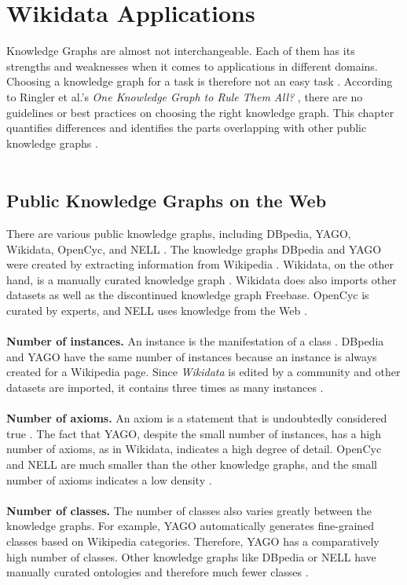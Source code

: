 ﻿\documentclass[11pt,titlepage,oneside,openany]{book}
\begin{document}
\chapter{Wikidata Applications}
\label{chap:applications}
Knowledge Graphs are almost not interchangeable. Each of them has its strengths and weaknesses when it comes to applications in different domains. Choosing a knowledge graph for a task is therefore not an easy task \cite{Ringler2017OneKG}. According to Ringler et al.'s \textit{One Knowledge Graph to Rule Them All?} \cite{Ringler2017OneKG}, there are no guidelines or best practices on choosing the right knowledge graph. This chapter quantifies differences and identifies the parts overlapping with other public knowledge graphs \cite{Ringler2017OneKG}.
\\
\\

\section{Public Knowledge Graphs on the Web}
There are various public knowledge graphs, including DBpedia, YAGO, Wikidata, OpenCyc, and NELL \cite{Ringler2017OneKG}. The knowledge graphs DBpedia and YAGO were created by extracting information from Wikipedia \cite{Lehmann2015DBpediaA}\cite{Suchanek2007YagoAC}. Wikidata, on the other hand, is a manually curated knowledge graph \cite{AFCK01}. Wikidata does also imports other datasets as well as the discontinued knowledge graph Freebase. OpenCyc is curated by experts, and NELL uses knowledge from the Web \cite{Ringler2017OneKG}.
\\
\\
\textbf{Number of instances. } An instance is the manifestation of a class \cite{instancedef}. DBpedia and YAGO have the same number of instances because an instance is always created for a Wikipedia page. Since \textit{Wikidata} is edited by a community and other datasets are imported, it contains three times as many instances \cite{Ringler2017OneKG}. 
\\
\\
\textbf{Number of axioms. } An axiom is a statement that is undoubtedly considered true \cite{axiomdef}. The fact that YAGO, despite the small number of instances, has a high number of axioms, as in Wikidata, indicates a high degree of detail. OpenCyc and NELL are much smaller than the other knowledge graphs, and the small number of axioms indicates a low density \cite{Ringler2017OneKG}. 
\\
\\
\textbf{Number of classes. } The number of classes also varies greatly between the knowledge graphs. For example, YAGO automatically generates fine-grained classes based on Wikipedia categories. Therefore, YAGO has a comparatively high number of classes. Other knowledge graphs like DBpedia or NELL have manually curated ontologies and therefore much fewer classes \cite{Ringler2017OneKG}. 
\\
\\
\end{document}
